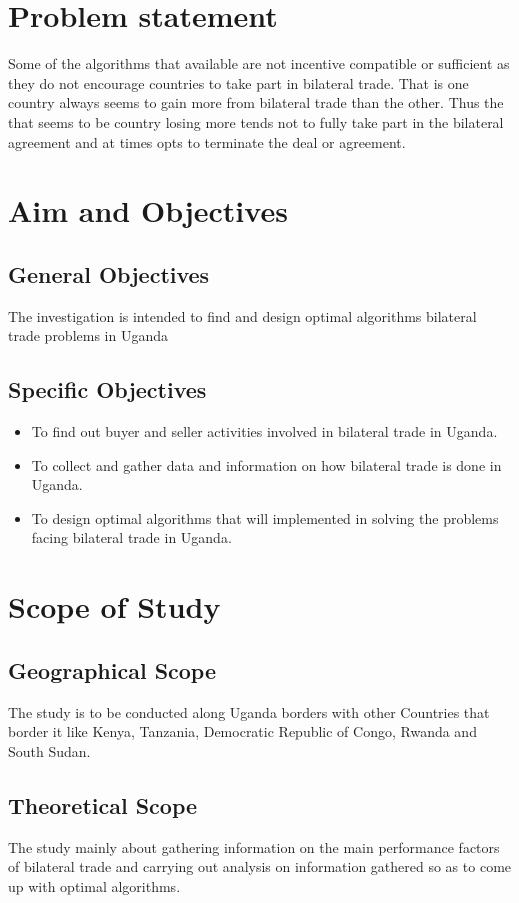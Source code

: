 \documentclass[12pt,a4paper]{article}
\begin{document}
\section{Problem statement}
Some of the algorithms that available are not incentive compatible or sufficient as they do not encourage countries to take part in bilateral trade. That is one country always seems to gain more from bilateral trade than the other. Thus the that seems to be country losing more tends not to fully take part in the bilateral agreement and at times opts to terminate the deal or agreement.
\section{Aim and Objectives}
\subsection{General Objectives}
The investigation is intended to find and design optimal algorithms bilateral trade problems in Uganda
\subsection{Specific Objectives}
\begin{itemize}
\item To find out buyer and seller activities involved in bilateral trade in Uganda.
\item To collect and gather data and information on how bilateral trade is done in Uganda.
\item To design optimal algorithms that will implemented in solving the problems facing bilateral trade in Uganda.
\end{itemize}

\section{Scope of Study}
\subsection{Geographical Scope}
The study is to be conducted along Uganda borders with other Countries that border it like Kenya, Tanzania, Democratic Republic of Congo, Rwanda and South Sudan.

\subsection{Theoretical Scope}
The study mainly about gathering information on the main performance factors of bilateral trade and carrying out analysis on information gathered so as to come up with optimal algorithms.
\end{document}
